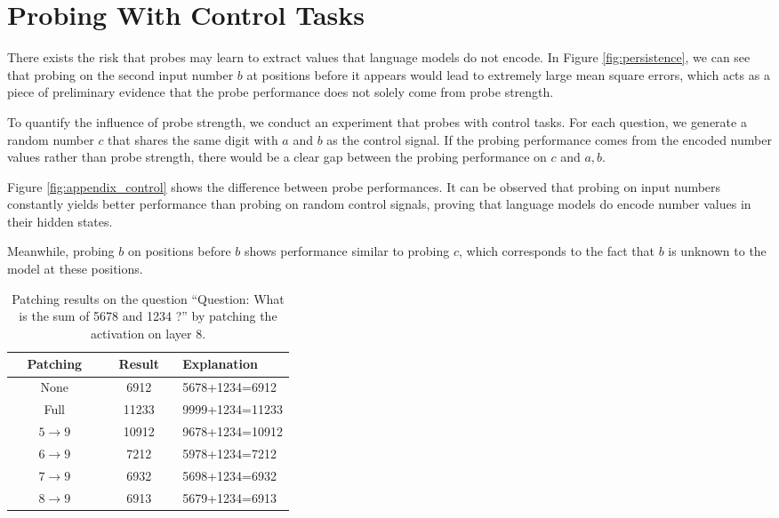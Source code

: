 \documentclass[11pt]{article}
\begin{document}
\section{Probing With Control Tasks}
There exists the risk that probes may learn to extract values that language models do not encode.
In Figure \ref{fig:persistence}, we can see that probing on the second input number $b$ at positions before it appears would lead to extremely large mean square errors, which acts as a piece of preliminary evidence that the probe performance does not solely come from probe strength.

To quantify the influence of probe strength, we conduct an experiment that probes with control tasks.
For each question, we generate a random number $c$ that shares the same digit with $a$ and $b$ as the control signal.
If the probing performance comes from the encoded number values rather than probe strength, there would be a clear gap between the probing performance on $c$ and $a, b$.

Figure \ref{fig:appendix_control} shows the difference between probe performances.
It can be observed that probing on input numbers constantly yields better performance than probing on random control signals, proving that language models do encode number values in their hidden states.

Meanwhile, probing $b$ on positions before $b$ shows performance similar to probing $c$, which corresponds to the fact that $b$ is unknown to the model at these positions.


\begin{table}[htbp]
    \centering
    \begin{tabular}{c|c|p{0.4\linewidth}}
    \hline
    Patching & Result & Explanation \\
    \hline
    None & 6912 & 5678+1234=6912 \\
    Full & 11233 & 9999+1234=11233 \\
    $5 \xrightarrow{} 9$ & 10912 & 9678+1234=10912 \\
    $6 \xrightarrow{} 9$ & 7212 & 5978+1234=7212 \\
    $7 \xrightarrow{} 9$ & 6932 & 5698+1234=6932 \\
    $8 \xrightarrow{} 9$ & 6913 & 5679+1234=6913 \\
    \hline
    \end{tabular}
    \caption{Patching results on the question ``Question: What is the sum of 5678 and 1234 ?'' by patching the activation on layer 8.}
    \label{tab:appendix_patch_example}
\end{table}
\end{document}

